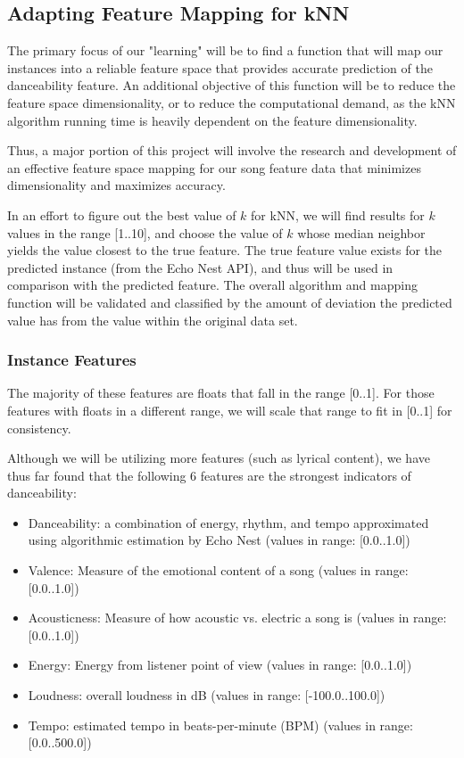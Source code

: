 \documentclass{article}
\begin{document}
\subsection{Adapting Feature Mapping for kNN}
The primary focus of our "learning" will be to find a function that will map our instances into a reliable feature space that provides accurate prediction of the danceability feature. An additional objective of this function will be to reduce the feature space dimensionality, or to reduce the computational demand, as the kNN algorithm running time is heavily dependent on the feature dimensionality.

Thus, a major portion of this project will involve the research and development of an effective feature space mapping for our song feature data that minimizes dimensionality and maximizes accuracy.

In an effort to figure out the best value of $ k $ for kNN, we will find results for $ k $ values in the range [1..10], and choose the value of $ k $ whose median neighbor yields the  value closest to the true feature. The true feature value exists for the predicted instance (from the Echo Nest API), and thus will be used in comparison with the predicted feature. The overall algorithm and mapping function will be validated and classified by the amount of deviation the predicted value has from the value within the original data set.

\subsubsection{Instance Features}
The majority of these features are floats that fall in the range [0..1]. For those features with floats in a different range, we will scale that range to fit in [0..1] for consistency.

Although we will be utilizing more features (such as lyrical content), we have thus far found that the following 6 features are the strongest indicators of danceability:

\begin{itemize}
\item Danceability: a combination of energy, rhythm, and tempo approximated using algorithmic estimation by Echo Nest (values in range: [0.0..1.0])
\item Valence: Measure of the emotional content of a song (values in range: [0.0..1.0])
\item Acousticness: Measure of how acoustic vs. electric a song is (values in range: [0.0..1.0])
\item Energy: Energy from listener point of view (values in range: [0.0..1.0])
\item Loudness: overall loudness in dB (values in range: [-100.0..100.0])
\item Tempo: estimated tempo in beats-per-minute (BPM) (values in range: [0.0..500.0])
\end{itemize}
\end{document}
